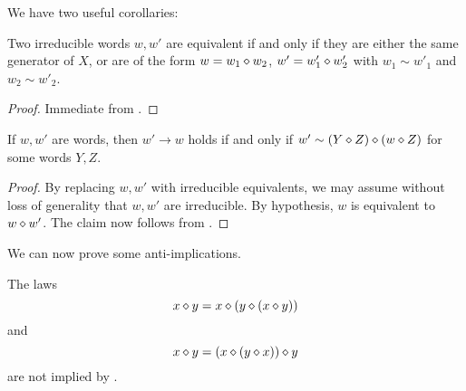 We have two useful corollaries:

\begin{corollary}\label{unique-factorization}\leanok{}  Two irreducible words $w, w'$ are equivalent if and only if they are either the same generator of $X$, or are of the form $w = w_1 \diamond w_2$, $w' = w'_1 \diamond w'_2$ with $w_1 \sim w'_1$ and $w_2 \sim w'_2$.
\end{corollary}

\begin{proof}\leanok  Immediate from .
\end{proof}

\begin{corollary}\label{graph-desc}  If $w,w'$ are words, then $w' \to w$ holds if and only if $w' \sim (Y \diamond Z) \diamond (w \diamond Z)$ for some words $Y,Z$.
\end{corollary}

\begin{proof}  By replacing $w,w'$ with irreducible equivalents, we may assume without loss of generality that $w,w'$ are irreducible.  By hypothesis, $w$ is equivalent to $w \diamond w'$.  The claim now follows from .
\end{proof}



We can now prove some anti-implications.

\begin{theorem}\label{854-anti}\leanok{}  The laws
\begin{equation}\label{3316}
  x \diamond y = x \diamond (y \diamond (x \diamond y))
\end{equation}
and
\begin{equation}\label{3925}
  x \diamond y = (x \diamond (y \diamond x)) \diamond y
\end{equation}
are not implied by .
\end{theorem}

